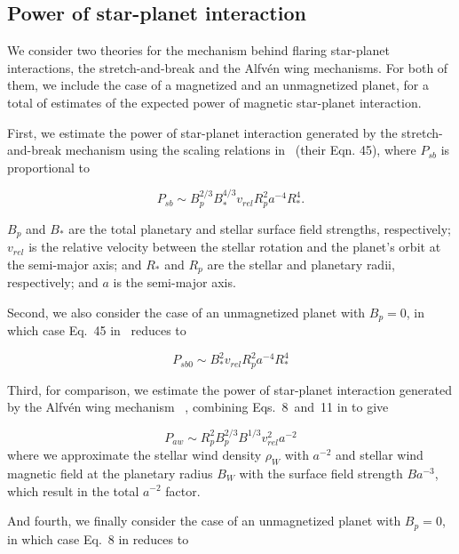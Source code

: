 \documentclass[twocolumn]{aastex631}
\begin{document}
\subsection{Power of star-planet interaction}
\label{methods:pspi}
We consider two theories for the mechanism behind flaring star-planet interactions, the stretch-and-break and the Alfv\'en wing mechanisms. For both of them, we include the case of a magnetized and an unmagnetized planet, for a total of estimates of the expected power of magnetic star-planet interaction.

First, we estimate the power of star-planet interaction generated by the stretch-and-break mechanism using the scaling relations in~\cite{lanza2012starplanet} (their Eqn. 45), where $P_{sb}$ is proportional to

\begin{equation}
    P_{sb} \sim B_p^{2/3} B_*^{4/3} v_{rel} R_p^2 a^{-4} R_*^4.
\end{equation}

$B_p$ and $B_*$ are the total planetary and stellar surface field strengths, respectively; $v_{rel}$ is the relative velocity between the stellar rotation and the planet's orbit at the semi-major axis; and $R_*$ and $R_p$ are the stellar and planetary radii, respectively; and $a$ is the semi-major axis.

Second, we also consider the case of an unmagnetized planet with $B_p=0$, in which case Eq.~45 in~\cite{lanza2012starplanet} reduces to

\begin{equation}
    P_{sb0} \sim B_*^2 v_{rel}  R_p^2  a^{-4} R_*^4
\end{equation}

Third, for comparison, we estimate the power of star-planet interaction generated by the Alfv\'en wing mechanism ~\cite{saur2013magnetic,kavanagh2022radio}, combining Eqs.~8~and~11 in \cite{kavanagh2022radio} to give

\begin{equation}
    P_{aw} \sim R_{p}^2  B_p^{2/3}  B^{1/3}  v_{rel}^2 a^{-2}  
\end{equation}
where we approximate the stellar wind density $\rho_W$ with $a^{-2}$ and stellar wind magnetic field at the planetary radius $B_W$ with the surface field strength $B a^{-3}$, which result in the total $a^{-2}$ factor.

And fourth, we finally consider the case of an unmagnetized planet with $B_p=0$, in which case Eq.~8 in \cite{kavanagh2022radio} reduces to
\end{document}
